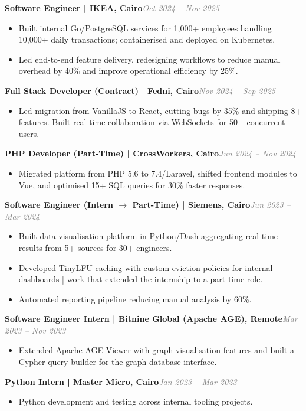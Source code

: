 \documentclass[a4paper,10pt]{article}
\newcommand{\role}[3]{%
    {\fontsize{7.8}{9.5}\selectfont\textbf{#1 | #2}}\hfill{\fontsize{7.2}{8.8}\selectfont\textit{\textcolor{grey}{#3}}}\\[0.4mm]%
}
\begin{document}
\role{Software Engineer}{IKEA, Cairo}{Oct 2024 -- Nov 2025}
\begin{itemize}
    \item Built internal Go/PostgreSQL services for 1,000+ employees handling 10,000+ daily transactions; containerised and deployed on Kubernetes.
    \item Led end-to-end feature delivery, redesigning workflows to reduce manual overhead by 40\% and improve operational efficiency by 25\%.
\end{itemize}

\role{Full Stack Developer (Contract)}{Fedni, Cairo}{Nov 2024 -- Sep 2025}
\begin{itemize}
    \item Led migration from VanillaJS to React, cutting bugs by 35\% and shipping 8+ features. Built real-time collaboration via WebSockets for 50+ concurrent users.
\end{itemize}

\role{PHP Developer (Part-Time)}{CrossWorkers, Cairo}{Jun 2024 -- Nov 2024}
\begin{itemize}
    \item Migrated platform from PHP 5.6 to 7.4/Laravel, shifted frontend modules to Vue, and optimised 15+ SQL queries for 30\% faster responses.
\end{itemize}

\role{Software Engineer (Intern $\to$ Part-Time)}{Siemens, Cairo}{Jun 2023 -- Mar 2024}
\begin{itemize}
    \item Built data visualisation platform in Python/Dash aggregating real-time results from 5+ sources for 30+ engineers.
    \item Developed TinyLFU caching with custom eviction policies for internal dashboards | work that extended the internship to a part-time role.
    \item Automated reporting pipeline reducing manual analysis by 60\%.
\end{itemize}

\role{Software Engineer Intern}{Bitnine Global (Apache AGE), Remote}{Mar 2023 -- Nov 2023}
\begin{itemize}
    \item Extended Apache AGE Viewer with graph visualisation features and built a Cypher query builder for the graph database interface.
\end{itemize}

\role{Python Intern}{Master Micro, Cairo}{Jan 2023 -- Mar 2023}
\begin{itemize}
    \item Python development and testing across internal tooling projects.
\end{itemize}
\end{document}
